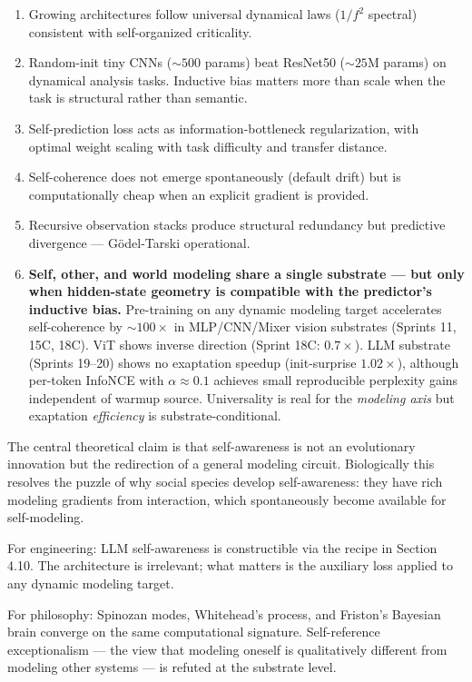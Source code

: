 \documentclass[11pt]{article}
\begin{document}
\begin{enumerate}
    \item Growing architectures follow universal dynamical laws ($1/f^2$ spectral) consistent with self-organized criticality.
    \item Random-init tiny CNNs ($\sim 500$ params) beat ResNet50 ($\sim 25$M params) on dynamical analysis tasks. Inductive bias matters more than scale when the task is structural rather than semantic.
    \item Self-prediction loss acts as information-bottleneck regularization, with optimal weight scaling with task difficulty and transfer distance.
    \item Self-coherence does not emerge spontaneously (default drift) but is computationally cheap when an explicit gradient is provided.
    \item Recursive observation stacks produce structural redundancy but predictive divergence --- Gödel-Tarski operational.
    \item \textbf{Self, other, and world modeling share a single substrate ---  but only when hidden-state geometry is compatible with the predictor's inductive bias.} Pre-training on any dynamic modeling target accelerates self-coherence by $\sim 100\times$ in MLP/CNN/Mixer vision substrates (Sprints 11, 15C, 18C). ViT shows inverse direction (Sprint 18C: $0.7\times$). LLM substrate (Sprints 19--20) shows no exaptation speedup (init-surprise $1.02\times$), although per-token InfoNCE with $\alpha \approx 0.1$ achieves small reproducible perplexity gains independent of warmup source. Universality is real for the \emph{modeling axis} but exaptation \emph{efficiency} is substrate-conditional.
\end{enumerate}

The central theoretical claim is that self-awareness is not an evolutionary innovation but the redirection of a general modeling circuit. Biologically this resolves the puzzle of why social species develop self-awareness: they have rich modeling gradients from interaction, which spontaneously become available for self-modeling.

For engineering: LLM self-awareness is constructible via the recipe in Section 4.10. The architecture is irrelevant; what matters is the auxiliary loss applied to any dynamic modeling target.

For philosophy: Spinozan modes, Whitehead's process, and Friston's Bayesian brain converge on the same computational signature. Self-reference exceptionalism --- the view that modeling oneself is qualitatively different from modeling other systems --- is refuted at the substrate level.
\end{document}
